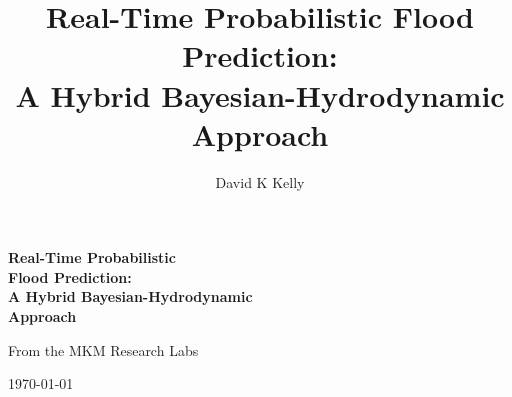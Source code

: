 \documentclass{article}
\title{Real-Time Probabilistic Flood Prediction:\\A Hybrid Bayesian-Hydrodynamic Approach}
\author{David K Kelly}
\date{}
\begin{document}
\begin{titlepage}
\begin{center}

\vspace*{2cm}

\begin{figure}\centering
{}
\end{figure}

\vspace{2cm}

{\Huge\bfseries Real-Time Probabilistic\\Flood Prediction:\\ A Hybrid Bayesian-Hydrodynamic\\Approach\par}

\vspace{2cm}

{\Large From the MKM Research Labs\par}

\vspace{1cm}

{\large \today\par}

\end{center}
\end{titlepage}
\clearpage


\tableofcontents

\clearpage
\end{document}
